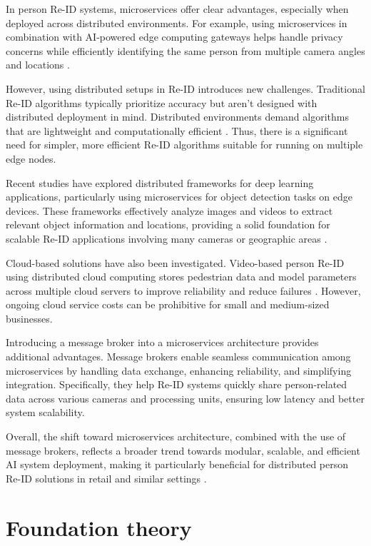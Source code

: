 \documentclass[../main.tex]{subfiles}
\begin{document}
In person Re-ID systems, microservices offer clear advantages, especially when deployed across distributed environments. For example, using microservices in combination with AI-powered edge computing gateways helps handle privacy concerns while efficiently identifying the same person from multiple camera angles and locations \cite{mdpi2021_microservice}.

However, using distributed setups in Re-ID introduces new challenges. Traditional Re-ID algorithms typically prioritize accuracy but aren't designed with distributed deployment in mind. Distributed environments demand algorithms that are lightweight and computationally efficient \cite{ieee2015_distributed}. Thus, there is a significant need for simpler, more efficient Re-ID algorithms suitable for running on multiple edge nodes.

Recent studies have explored distributed frameworks for deep learning applications, particularly using microservices for object detection tasks on edge devices. These frameworks effectively analyze images and videos to extract relevant object information and locations, providing a solid foundation for scalable Re-ID applications involving many cameras or geographic areas \cite{mdpi2023_framework}.

Cloud-based solutions have also been investigated. Video-based person Re-ID using distributed cloud computing stores pedestrian data and model parameters across multiple cloud servers to improve reliability and reduce failures \cite{jait2022_cloud}. However, ongoing cloud service costs can be prohibitive for small and medium-sized businesses.

Introducing a message broker into a microservices architecture provides additional advantages. Message brokers enable seamless communication among microservices by handling data exchange, enhancing reliability, and simplifying integration. Specifically, they help Re-ID systems quickly share person-related data across various cameras and processing units, ensuring low latency and better system scalability.

Overall, the shift toward microservices architecture, combined with the use of message brokers, reflects a broader trend towards modular, scalable, and efficient AI system deployment, making it particularly beneficial for distributed person Re-ID solutions in retail and similar settings \cite{splunk2024}.


\section{Foundation theory}
\label{sec:foundtheo}
\end{document}
